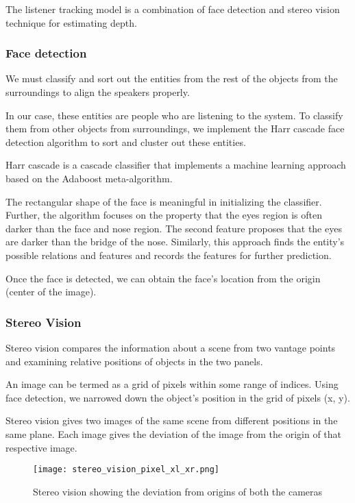 \documentclass[../../hardware_design_intro/hardware_design_intro.tex]{subfiles}
\begin{document}
    
The listener tracking model is a combination of face detection and stereo vision 
technique for estimating depth.

\subsubsection{Face detection}

We must classify and sort out the entities from the rest of the objects from the 
surroundings to align the speakers properly.

In our case, these entities are people who are listening to the system. To classify 
them from other objects from surroundings, we implement the Harr cascade face detection 
algorithm to sort and cluster out these entities.

Harr cascade is a cascade classifier that implements a machine learning approach based 
on the Adaboost meta-algorithm.

The rectangular shape of the face is meaningful in initializing the classifier. Further, 
the algorithm focuses on the property that the eyes region is often darker than the face 
and nose region. The second feature proposes that the eyes are darker than the bridge of 
the nose. Similarly, this approach finds the entity's possible relations and features 
and records the features for further prediction. 

Once the face is detected, we can obtain the face's location from the origin (center of 
the image).

\subsubsection{Stereo Vision}

Stereo vision compares the information about a scene from two vantage points and 
examining relative positions of objects in the two panels.

An image can be termed as a grid of pixels within some range of indices. Using face 
detection, we narrowed down the object's position in the grid of pixels (x, y). 

Stereo vision gives two images of the same scene from different positions in the same 
plane. Each image gives the deviation of the image from the origin of that respective 
image.

\begin{figure*}
    \centering
    \texttt{[image: stereo\_vision\_pixel\_xl\_xr.png]}
    \caption{Stereo vision showing the deviation from origins of both the cameras}
\end{figure*}
\end{document}
